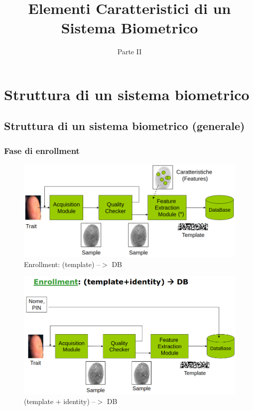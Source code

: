 \documentclass{report}
\title{Elementi Caratteristici di un Sistema Biometrico}
\date{Parte II}
\begin{document}
\maketitle

\tableofcontents
\newpage


\chapter{Struttura di un sistema biometrico}


\section{Struttura di un sistema biometrico (generale)}

\subsection{Fase di enrollment}

\begin{figure}[ht]
    \centering
    \includegraphics[width=0.95\linewidth]{images/enrollment-gen.png}
    \caption{Enrollment: (template) --$>$ DB}
    \label{fig:enroll-gen}
\end{figure}

\begin{figure}[ht]
    \centering
    \includegraphics[width=0.95\linewidth]{images/enrollment-gen-id.png}
    \caption{(template + identity) --$>$ DB}
    \label{fig:enroll-gen-id}
\end{figure}
\end{document}
